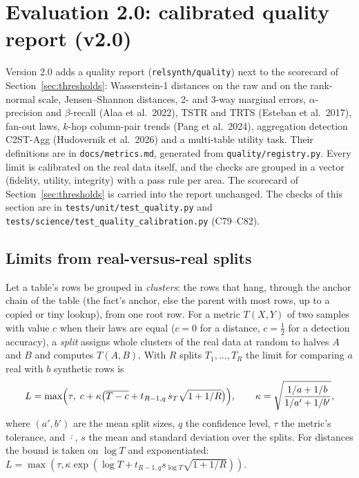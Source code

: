 \section{Evaluation 2.0: calibrated quality report (v2.0)}\label{sec:v20quality}
Version 2.0 adds a quality report (\texttt{relsynth/quality}) next to the scorecard of Section~\ref{sec:thresholds}: Wasserstein-1 distances on the raw and on the rank-normal scale, Jensen--Shannon distances, 2- and 3-way marginal errors, $\alpha$-precision and $\beta$-recall (Alaa et al.\ 2022), TSTR and TRTS (Esteban et al.\ 2017), fan-out laws, $k$-hop column-pair trends (Pang et al.\ 2024), aggregation detection C2ST-Agg (Hudovernik et al.\ 2026) and a multi-table utility task. Their definitions are in \texttt{docs/metrics.md}, generated from \texttt{quality/registry.py}. Every limit is calibrated on the real data itself, and the checks are grouped in a vector (fidelity, utility, integrity) with a pass rule per area. The scorecard of Section~\ref{sec:thresholds} is carried into the report unchanged. The checks of this section are in \texttt{tests/unit/test\_quality.py} and \texttt{tests/science/test\_quality\_calibration.py} (C79--C82).

\subsection{Limits from real-versus-real splits}
Let a table's rows be grouped in \emph{clusters}: the rows that hang, through the anchor chain of the table (the fact's anchor, else the parent with most rows, up to a copied or tiny lookup), from one root row. For a metric $T(X,Y)$ of two samples with value $c$ when their laws are equal ($c=0$ for a distance, $c=\tfrac12$ for a detection accuracy), a \emph{split} assigns whole clusters of the real data at random to halves $A$ and $B$ and computes $T(A,B)$. With $R$ splits $T_1,\dots,T_R$ the limit for comparing $a$ real with $b$ synthetic rows is
\[
L=\max\Bigl(\tau,\;c+\kappa\bigl(\overline{T-c}+t_{R-1,q}\,s_T\sqrt{1+1/R}\bigr)\Bigr),\qquad \kappa=\sqrt{\frac{1/a+1/b}{1/a'+1/b'}},
\]
where $(a',b')$ are the mean split sizes, $q$ the confidence level, $\tau$ the metric's tolerance, and $\overline{\cdot}$, $s$ the mean and standard deviation over the splits. For distances the bound is taken on $\log T$ and exponentiated: $L=\max(\tau,\kappa\exp(\overline{\log T}+t_{R-1,q}s_{\log T}\sqrt{1+1/R}))$.


